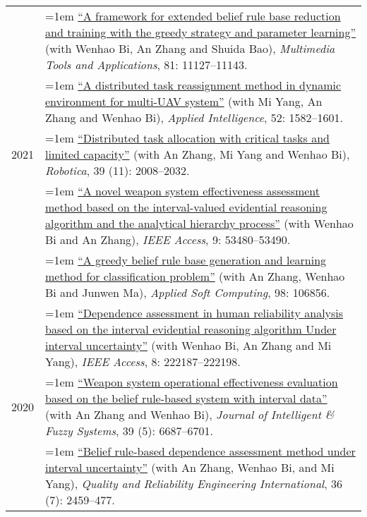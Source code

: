 \documentclass[11pt,english]{article}
\begin{document}
\begin{tabular}{p{.85in}>{\hangindent=1em}p{5.65in}<{\raggedright}}
 &  \href{https://doi.org/10.1007/s11042-022-12232-4}{``A framework for extended belief rule base reduction and training with the greedy strategy and parameter learning''} (with Wenhao Bi, An Zhang and Shuida Bao), \textit{Multimedia Tools and Applications}, 81: 11127--11143. \\
 &  \href{https://doi.org/10.1007/s10489-021-02502-3}{``A distributed task reassignment method in dynamic environment for multi-UAV system''} (with Mi Yang, An Zhang and Wenhao Bi), \textit{Applied Intelligence}, 52: 1582--1601. \\
2021 &  \href{https://doi.org/10.1017/S0263574721000102}{``Distributed task allocation with critical tasks and limited capacity''} (with An Zhang, Mi Yang and Wenhao Bi), \textit{Robotica}, 39 (11): 2008--2032. \\
 &  \href{https://doi.org/10.1109/ACCESS.2021.3071419}{``A novel weapon system effectiveness assessment method based on the interval-valued evidential reasoning algorithm and the analytical hierarchy process''} (with Wenhao Bi and An Zhang), \textit{IEEE Access}, 9: 53480--53490. \\
 &  \href{https://doi.org/10.1016/j.asoc.2020.106856}{``A greedy belief rule base generation and learning method for classification problem''} (with An Zhang, Wenhao Bi and Junwen Ma), \textit{Applied Soft Computing}, 98: 106856. \\

 &  \href{https://doi.org/10.1109/ACCESS.2020.3043848}{``Dependence assessment in human reliability analysis based on the interval evidential reasoning algorithm Under interval uncertainty''} (with Wenhao Bi, An Zhang and Mi Yang), \textit{IEEE Access}, 8: 222187--222198. \\

2020 &  \href{https://doi.org/10.3233/JIFS-190651}{``Weapon system operational effectiveness evaluation based on the belief rule-based system with interval data''} (with An Zhang and Wenhao Bi), \textit{Journal of Intelligent \& Fuzzy Systems}, 39 (5): 6687--6701. \\
 &  \href{https://doi.org/10.1002/qre.2708}{``Belief rule-based dependence assessment method under interval uncertainty''} (with An Zhang, Wenhao Bi, and Mi Yang), \textit{Quality and Reliability Engineering International}, 36 (7): 2459--477. \\
  \end{tabular}
\end{document}

